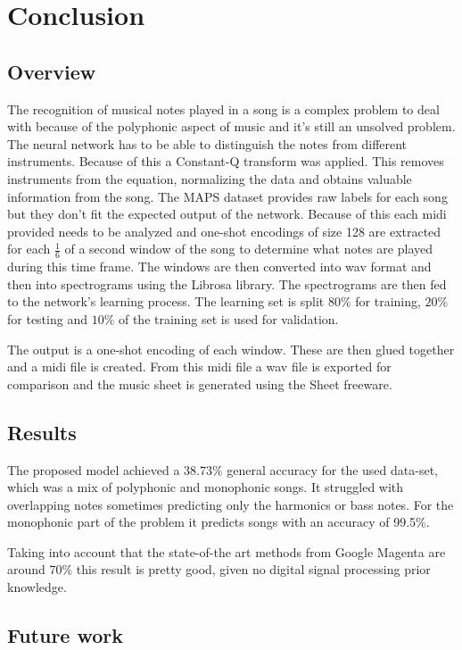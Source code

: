 \newpage
\section{Conclusion}
\subsection{Overview}
The recognition of musical notes played in a song is a complex problem to deal with because of the polyphonic aspect of music and it's still an unsolved problem. The neural network has to be able to distinguish the notes from different instruments. Because of this a Constant-Q transform was applied. This removes instruments from the equation, normalizing the data and obtains valuable information from the song. The MAPS dataset \cite{maps} provides raw labels for each song but they don't fit the expected output of the network. Because of this each midi provided needs to be analyzed and one-shot encodings of size 128 are extracted for each $\frac{1}{6}$ of a second window of the song to determine what notes are played during this time frame. The windows are then converted into wav format and then into spectrograms using the Librosa \cite{librosa} library. The spectrograms are then fed to the network's learning process. The learning set is split $80\%$ for training, $20\%$ for testing and $10\%$ of the training set is used for validation.

\par
The output is a one-shot encoding of each window. These are then glued together and a midi file is created. From this midi file a wav file is exported for comparison and the music sheet is generated using the Sheet freeware. \cite{sheet}

\subsection{Results}
The proposed model achieved a $38.73\%$ general accuracy for the used data-set, which was a mix of polyphonic and monophonic songs. It struggled with overlapping notes sometimes predicting only the harmonics or bass notes. For the monophonic part of the problem it predicts songs with an accuracy of 99.5\%. 
\par
Taking into account that the state-of-the art methods from Google Magenta are around 70\% this result is pretty good, given no digital signal processing prior knowledge.

\subsection{Future work}

